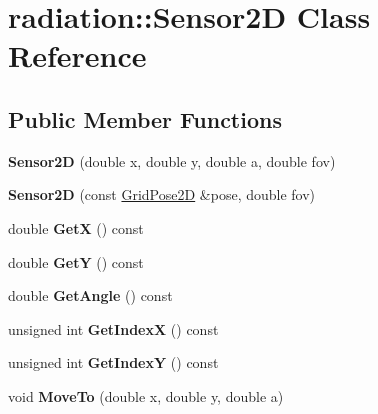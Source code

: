\hypertarget{classradiation_1_1_sensor2_d}{}\section{radiation\+:\+:Sensor2D Class Reference}
\label{classradiation_1_1_sensor2_d}
\subsection*{Public Member Functions}
\begin{DoxyCompactItemize}
\item 
\hypertarget{classradiation_1_1_sensor2_d_a26cca8f950272e08d89ff88c0d5bfa3b}{}\label{classradiation_1_1_sensor2_d_a26cca8f950272e08d89ff88c0d5bfa3b} 
{\bfseries Sensor2D} (double x, double y, double a, double fov)
\item 
\hypertarget{classradiation_1_1_sensor2_d_abb3d8c68ba7a41f929cbba1eff8017c2}{}\label{classradiation_1_1_sensor2_d_abb3d8c68ba7a41f929cbba1eff8017c2} 
{\bfseries Sensor2D} (const \hyperlink{classradiation_1_1_grid_pose2_d}{Grid\+Pose2D} \&pose, double fov)
\item 
\hypertarget{classradiation_1_1_sensor2_d_af180a3e016f11821a512f2ffa642b954}{}\label{classradiation_1_1_sensor2_d_af180a3e016f11821a512f2ffa642b954} 
double {\bfseries GetX} () const
\item 
\hypertarget{classradiation_1_1_sensor2_d_a53726de4ee8872797d658bb072f28760}{}\label{classradiation_1_1_sensor2_d_a53726de4ee8872797d658bb072f28760} 
double {\bfseries GetY} () const
\item 
\hypertarget{classradiation_1_1_sensor2_d_a19c3e47b755d9f910a9dd1a3db726bb4}{}\label{classradiation_1_1_sensor2_d_a19c3e47b755d9f910a9dd1a3db726bb4} 
double {\bfseries Get\+Angle} () const
\item 
\hypertarget{classradiation_1_1_sensor2_d_a01fa35397b1da61503eb664387260111}{}\label{classradiation_1_1_sensor2_d_a01fa35397b1da61503eb664387260111} 
unsigned int {\bfseries Get\+IndexX} () const
\item 
\hypertarget{classradiation_1_1_sensor2_d_a8d3cce14967a6faa3976f4eee2346328}{}\label{classradiation_1_1_sensor2_d_a8d3cce14967a6faa3976f4eee2346328} 
unsigned int {\bfseries Get\+IndexY} () const
\item 
\hypertarget{classradiation_1_1_sensor2_d_a1980516ff2b0b67d1acc518e415ead6d}{}\label{classradiation_1_1_sensor2_d_a1980516ff2b0b67d1acc518e415ead6d} 
void {\bfseries Move\+To} (double x, double y, double a)

\end{DoxyCompactItemize}
